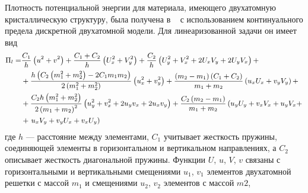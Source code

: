 
Плотность потенциальной энергии для материала, имеющего двухатомную кристаллическую структуру, была получена в \ \cite{bound_porsp17} с использованием континуального предела дискретной двухатомной модели. Для линеаризованной задачи он имеет вид
\begin{equation}
\begin{small} 
	\begin{aligned}
		\Pi_l = & \frac{C_1}{h} \left(u^2 + v^2\right) + \frac{C_1+C_2}{h}\left(U_x^2+V_y^2\right) +\frac{C_2}{h}\left(U_y^2 + V_x^2 + 2U_x V_y + 2 U_y V_x\right) + \\ 
		& + \frac{h\left(C_2\left(m_1^2 + m_2^2\right) - 2C_1 m_1 m_2\right)}{2\left(m_1^2 + m_2^2\right)}\left(u_x^2 + v_y^2\right) + \frac{\left(m_2-m_1\right)\left(C_1+C_2\right)}{m_1+m_2}\left(u_x U_x + v_y V_y\right) + \\ 
		& + \frac{C_2 h\left(m_1^2+m_2^2\right)}{2\left(m_1+m_2\right)^2}\left(u_y^2+v_x^2+2u_y v_x + 2u_x v_y\right) + \frac{C_2\left(m_2 - m_1\right)}{m_1 + m_2}\left(u_y U_y+v_x V_x + u_y V_x + \right. \\
		& + \left. u_x V_y + v_y U_x + v_x U_y\right)
	\end{aligned}
\end{small}
\end{equation}
где $h$ --- расстояние между элементами, $C_1$ учитывает жесткость пружины, соединяющей элементы в горизонтальном и вертикальном направлениях, а $C_2$ описывает жесткость диагональной пружины. Функции $U$, $u$, $V$, $v$ связаны с горизонтальными и вертикальными смещениями $u_1$, $v_1$ элементов двухатомной решетки с массой $m_1$ и смещениями $u_2$, $v_2$ элементов с массой $m2$,

